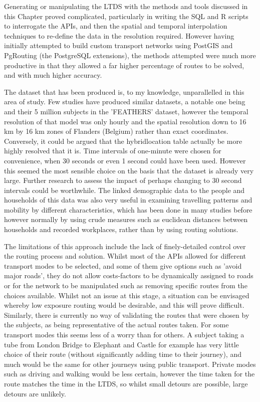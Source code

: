 Generating or manipulating the LTDS with the methods and tools discussed in this Chapter proved complicated, particularly in writing the SQL and R scripts to interrogate the APIs, and then the spatial and temporal interpolation techniques to re-define the data in the resolution required. However having initially attempted to build custom transport networks using PostGIS and PgRouting (the PostgreSQL extensions), the methods attempted were much more productive in that they allowed a far higher percentage of routes to be solved, and with much higher accuracy. 

The dataset that has been produced is, to my knowledge, unparallelled in this area of study. Few studies have produced similar datasets, a notable one being \cite{Dhondt2012} and their 5 million subjects in the 'FEATHERS' dataset, however the temporal resolution of that model was only hourly and the spatial resolution down to 16 km by 16 km zones of Flanders (Belgium) rather than exact coordinates. Conversely, it could be argued that the hybrid\textunderscore location table actually be more highly resolved that it is. Time intervals of one-minute were chosen for convenience, when 30 seconds or even 1 second could have been used. However this seemed the most sensible choice on the basis that the dataset is already very large. Further research to assess the impact of perhaps changing to 30 second intervals could be worthwhile. The linked demographic data to the people and households of this data was also very useful in examining travelling patterns and mobility by different characteristics, which has been done in many studies before however normally by using crude measures such as euclidean distances between households and recorded workplaces, rather than by using routing solutions.

The limitations of this approach include the lack of finely-detailed control over the routing process and solution. Whilst most of the APIs allowed for different transport modes to be selected, and some of them give options such as 'avoid major roads', they do not allow costs-factors to be dynamically assigned to roads or for the network to be manipulated such as removing specific routes from the choices available. Whilst not an issue at this stage, a situation can be envisaged whereby low exposure routing would be desirable, and this will prove difficult. Similarly, there is currently no way of validating the routes that were chosen by the subjects, as being representative of the actual routes taken. For some transport modes this seems less of a worry than for others. A subject taking a tube from London Bridge to Elephant and Castle for example has very little choice of their route (without significantly adding time to their journey), and much would be the same for other journeys using public transport. Private modes such as driving and walking would be less certain, however the time taken for the route matches the time in the LTDS, so whilst small detours are possible, large detours are unlikely.

